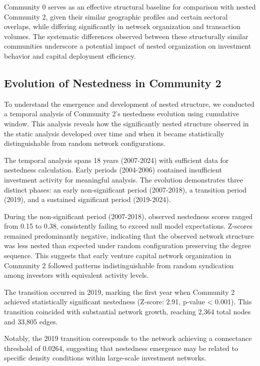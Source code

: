 Community 0 serves as an effective structural baseline for comparison with nested Community 2, given their similar geographic profiles and certain sectoral overlaps, while differing significantly in network organization and transaction volumes. The systematic differences observed between these structurally similar communities underscore a potential impact of nested organization on investment behavior and capital deployment efficiency.

\subsection{Evolution of Nestedness in Community 2}

To understand the emergence and development of nested structure, we conducted a temporal analysis of Community 2's nestedness evolution using cumulative window. This analysis reveals how the significantly nested structure observed in the static analysis developed over time and when it became statistically distinguishable from random network configurations.

The temporal analysis spans 18 years (2007-2024) with sufficient data for nestedness calculation. Early periods (2004-2006) contained insufficient investment activity for meaningful analysis. The evolution demonstrates three distinct phases: an early non-significant period (2007-2018), a transition period (2019), and a sustained significant period (2019-2024).

During the non-significant period (2007-2018), observed nestedness scores ranged from 0.15 to 0.38, consistently failing to exceed null model expectations. Z-scores remained predominantly negative, indicating that the observed network structure was less nested than expected under random configuration preserving the degree sequence. This suggests that early venture capital network organization in Community 2 followed patterns indistinguishable from random syndication among investors with equivalent activity levels.

The transition occurred in 2019, marking the first year when Community 2 achieved statistically significant nestedness (Z-score: 2.91, p-value < 0.001). This transition coincided with substantial network growth, reaching 2,364 total nodes and 33,805 edges. 

Notably, the 2019 transition corresponds to the network achieving a connectance threshold of 0.0264, suggesting that nestedness emergence may be related to specific density conditions within large-scale investment networks.

